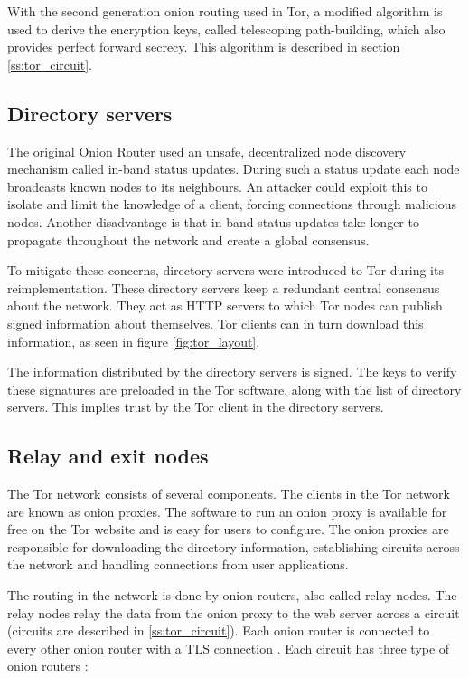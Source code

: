 \documentclass[12pt,journal,compsoc]{IEEEtran}
\begin{document}
		With the second generation onion routing used in Tor, a modified algorithm is used to derive the encryption keys, called telescoping path-building, which also provides perfect forward secrecy. This algorithm is described in section \ref{ss:tor_circuit}.
		
	\subsection{Directory servers}
		The original Onion Router used an unsafe, decentralized node discovery mechanism called in-band status updates. During such a status update each node broadcasts known nodes to its neighbours. An attacker could exploit this to isolate and limit the knowledge of a client, forcing connections through malicious nodes. Another disadvantage is that in-band status updates take longer to propagate throughout the network and create a global consensus.
					
		To mitigate these concerns, directory servers were introduced to Tor during its reimplementation. These directory servers keep a redundant central consensus about the network. They act as HTTP servers to which Tor nodes can publish signed information about themselves. Tor clients can in turn download this information, as seen in figure \ref{fig:tor_layout}.
					
		The information distributed by the directory servers is signed. The keys to verify these signatures are preloaded in the Tor software, along with the list of directory servers. This implies trust by the Tor client in the directory servers.

	\subsection{Relay and exit nodes}
		The Tor network consists of several components. The clients in the Tor network are known as onion proxies. The software to run an onion proxy is available for free on the Tor website \cite{torprojectwebsite} and is easy for users to configure. The onion proxies are responsible for downloading the directory information, establishing circuits across the network and handling connections from user applications.
		
		The routing in the network is done by onion routers, also called relay nodes. The relay nodes relay the data from the onion proxy to the web server across a circuit (circuits are described in \ref{ss:tor_circuit}). Each onion router is connected to every other onion router with a TLS connection \cite{tlsprotocol}. Each circuit has three type of onion routers \cite{mccoy2008shining}:
		
\end{document}
